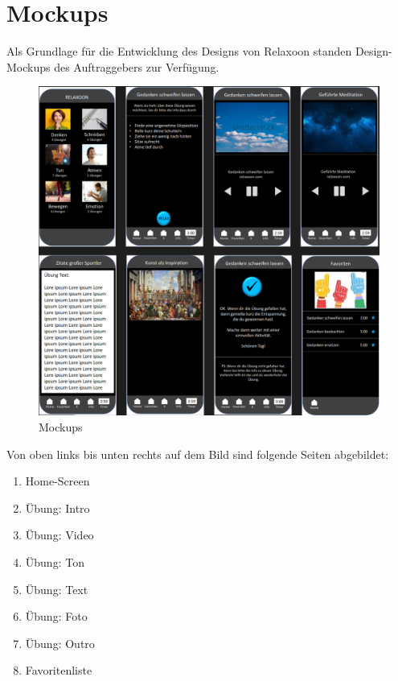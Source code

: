 
\section{Mockups}

Als Grundlage für die Entwicklung des Designs von Relaxoon standen Design-Mockups des Auftraggebers zur Verfügung.

\begin{figure}[H]
    \centering
    \includegraphics[height=\textwidth]{./pics/mockups.png}
    \caption{Mockups}
\end{figure}

Von oben links bis unten rechts auf dem Bild sind folgende Seiten abgebildet:

\begin{enumerate}
    \item Home-Screen
    \item Übung: Intro
    \item Übung: Video
    \item Übung: Ton
    \item Übung: Text
    \item Übung: Foto
    \item Übung: Outro
    \item Favoritenliste
\end{enumerate}

